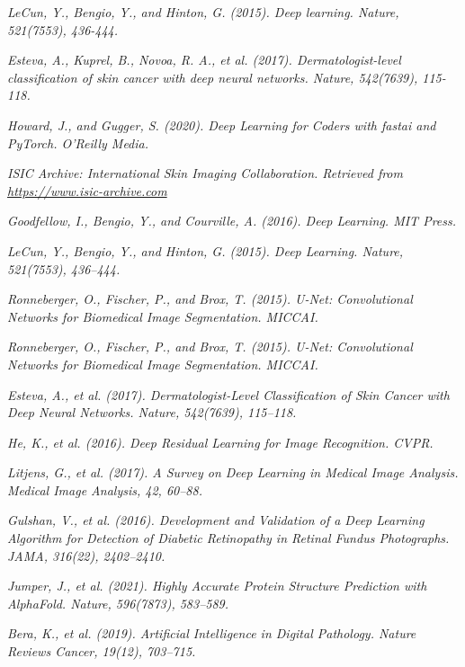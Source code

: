 \documentclass[a4paper,12pt]{report}
\begin{document}
\begin{spacing}{1.5}
\begin{thebibliography}{99}
 \emph{LeCun, Y., Bengio, Y., and Hinton, G. (2015). Deep learning. Nature, 521(7553), 436-444.}

 \emph{Esteva, A., Kuprel, B., Novoa, R. A., et al. (2017). Dermatologist-level classification of skin cancer with deep neural networks. Nature, 542(7639), 115-118.}

 \emph{Howard, J., and Gugger, S. (2020). Deep Learning for Coders with fastai and PyTorch. O'Reilly Media.}

 \emph{ISIC Archive: International Skin Imaging Collaboration. Retrieved from \url{https://www.isic-archive.com}}



 \emph{Goodfellow, I., Bengio, Y., and Courville, A. (2016). Deep Learning. MIT Press.}

 \emph{LeCun, Y., Bengio, Y., and Hinton, G. (2015). Deep Learning. Nature, 521(7553), 436–444.}

 \emph{Ronneberger, O., Fischer, P., and Brox, T. (2015). U-Net: Convolutional Networks for Biomedical Image Segmentation. MICCAI.}

 \emph{Ronneberger, O., Fischer, P., and Brox, T. (2015). U-Net: Convolutional Networks for Biomedical Image Segmentation. MICCAI.}

 \emph{Esteva, A., et al. (2017). Dermatologist-Level Classification of Skin Cancer with Deep Neural Networks. Nature, 542(7639), 115–118.}

 \emph{He, K., et al. (2016). Deep Residual Learning for Image Recognition. CVPR.}

 \emph{Litjens, G., et al. (2017). A Survey on Deep Learning in Medical Image Analysis. Medical Image Analysis, 42, 60–88.}

 \emph{Gulshan, V., et al. (2016). Development and Validation of a Deep Learning Algorithm for Detection of Diabetic Retinopathy in Retinal Fundus Photographs. JAMA, 316(22), 2402–2410.}

 \emph{Jumper, J., et al. (2021). Highly Accurate Protein Structure Prediction with AlphaFold. Nature, 596(7873), 583–589.}

 \emph{Bera, K., et al. (2019). Artificial Intelligence in Digital Pathology. Nature Reviews Cancer, 19(12), 703–715.}


\end{thebibliography}
\end{spacing}
\end{document}
